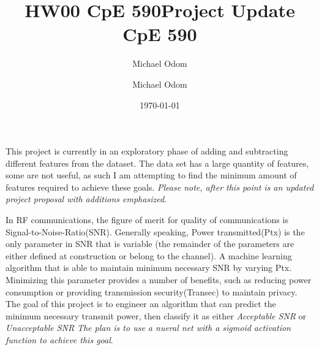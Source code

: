 \documentclass[10pt,a4paper]{article}
\author{Michael Odom}
\title{HW00 CpE 590}
\begin{document}
\title{Project Update CpE 590}
\author{Michael Odom}
\date{\today}

\maketitle
\begin{center}
This project is currently in an exploratory phase of adding and subtracting different features from the dataset. The data set has a large quantity of features, some are not useful, as such I am attempting to find the minimum amount of features required to achieve these goals. \emph{Please note, after this point is an updated project proposal with additions emphasized.}
\end{center}
\begin{center}

In RF communications, the figure of merit for quality of communications is Signal-to-Noise-Ratio(SNR). Generally speaking, Power transmitted(Ptx) is the only parameter in SNR that is variable (the remainder of the parameters are either defined at construction or belong to the channel). A machine learning algorithm that is able to maintain minimum necessary SNR by varying Ptx. Minimizing this parameter provides a number of benefits, such as reducing power consumption or providing transmission security(Transec) to maintain privacy. The goal of this project is to engineer	an algorithm that can predict the minimum necessary transmit power, then classify it as either \emph{Acceptable SNR} or \emph{Unacceptable SNR} \emph{The plan is to use a nueral net with a sigmoid activation function to achieve this goal}.
\end{center}
\end{document}
